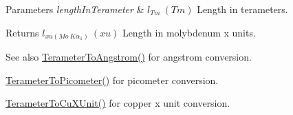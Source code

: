 \begin{DoxyParams}{Parameters}
{\em length\+In\+Terameter} & $ l_{Tm}\ (Tm)$ Length in terameters. \\
\hline
\end{DoxyParams}
\begin{DoxyReturn}{Returns}
$ l_{xu(Mo\ K\alpha_1)}\ (xu)$ Length in molybdenum x units. 
\end{DoxyReturn}
\begin{DoxySeeAlso}{See also}
\mbox{\hyperlink{group___e_g_x_math-_conversions-_length_conversions-_terameter-_non-_s_i_gaab75399e224bea4ea7ddb8bf5f557ee0}{Terameter\+To\+Angstrom()}} for angstrom conversion. 

\mbox{\hyperlink{group___e_g_x_math-_conversions-_length_conversions-_terameter-_s_i_ga131f3ccf4db05a31f5bd5c9487da9a4e}{Terameter\+To\+Picometer()}} for picometer conversion. 

\mbox{\hyperlink{group___e_g_x_math-_conversions-_length_conversions-_terameter-_non-_s_i_ga5eab9d29867c570350691cca342c9472}{Terameter\+To\+Cu\+X\+Unit()}} for copper x unit conversion. 
\end{DoxySeeAlso}
